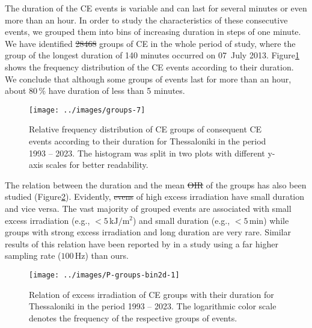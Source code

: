 \documentclass[preprint, 5p,
authoryear]{elsarticle} %
\providecommand{\DIFaddtex}[1]{{\protect\color{blue}\uwave{#1}}} %
\providecommand{\DIFdeltex}[1]{{\protect\color{red}\sout{#1}}}                      %
\providecommand{\DIFaddbegin}{} %
\providecommand{\DIFaddend}{} %
\providecommand{\DIFdelbegin}{} %
\providecommand{\DIFdelend}{} %
\providecommand{\DIFadd}[1]{\texorpdfstring{\DIFaddtex{#1}}{#1}} %
\providecommand{\DIFdel}[1]{\texorpdfstring{\DIFdeltex{#1}}{}} %
\newcommand{\DIFscaledelfig}{0.5}
\newlength{\DIFdelgraphicswidth} %
\newlength{\DIFdelgraphicsheight} %
\newcommand{\DIFaddincludegraphics}[2][]{{\color{blue}\fbox{\DIFOincludegraphics[#1]{#2}}}} %
\newcommand{\DIFdelincludegraphics}[2][]{%
\sbox{\DIFdelgraphicsbox}{\DIFOincludegraphics[#1]{#2}}%
\settoboxwidth{\DIFdelgraphicswidth}{\DIFdelgraphicsbox} %
\settoboxtotalheight{\DIFdelgraphicsheight}{\DIFdelgraphicsbox} %
\scalebox{\DIFscaledelfig}{%
\parbox[b]{\DIFdelgraphicswidth}{\usebox{\DIFdelgraphicsbox}\\[-\baselineskip] \rule{\DIFdelgraphicswidth}{0em}}\llap{\resizebox{\DIFdelgraphicswidth}{\DIFdelgraphicsheight}{%
\setlength{\unitlength}{\DIFdelgraphicswidth}%
\begin{picture}(1,1)%
\thicklines\linethickness{2pt} %
{\color[rgb]{1,0,0}\put(0,0){\framebox(1,1){}}}%
{\color[rgb]{1,0,0}\put(0,0){\line( 1,1){1}}}%
{\color[rgb]{1,0,0}\put(0,1){\line(1,-1){1}}}%
\end{picture}%
}\hspace*{3pt}}} %
} %
\DeclareRobustCommand{\DIFaddbegin}{\DIFOaddbegin \let\includegraphics\DIFaddincludegraphics} %
\DeclareRobustCommand{\DIFaddend}{\DIFOaddend \let\includegraphics\DIFOincludegraphics} %
\DeclareRobustCommand{\DIFdelbegin}{\DIFOdelbegin \let\includegraphics\DIFdelincludegraphics} %
\DeclareRobustCommand{\DIFdelend}{\DIFOaddend \let\includegraphics\DIFOincludegraphics} %
\begin{document}
The duration of the CE events is variable and can last for several
minutes or even more than an hour. In order to study the characteristics
of these consecutive events, we grouped them into bins of increasing
duration in steps of one minute. We have identified \DIFdelbegin \DIFdel{28468 }\DIFdelend \DIFaddbegin \DIFadd{28062 }\DIFaddend groups of CE
in the whole period of study, where the group of the longest duration of
140 minutes occurred on 07~July 2013.
Figure\nobreakspace{}\ref{fig:ceg-duration-distribution} shows the
frequency distribution of the CE events according to their duration. We
conclude that although some groups of events last for more than an hour,
about \(80\,\%\) have duration of less than 5 minutes.

\begin{figure}

{\centering \texttt{[image: ../images/groups-7]} 

}

\caption{Relative frequency distribution of CE groups of consequent CE events according to their duration for Thessaloniki in the period 1993 -- 2023. The histogram was split in two plots with different y-axis scales for better readability.}\label{fig:ceg-duration-distribution}
\end{figure}

The relation between the duration and the mean \DIFdelbegin \DIFdel{OIR }\DIFdelend \DIFaddbegin \DIFadd{OI }\DIFaddend of the groups has also
been studied (Figure\nobreakspace{}\ref{fig:group-2d}). Evidently,
\DIFdelbegin \DIFdel{evens }\DIFdelend \DIFaddbegin \DIFadd{events }\DIFaddend of high excess irradiation have small duration and vice versa.
The vast majority of grouped events are associated with small excess
irradiation (e.g., \(<5\,\text{kJ}/\text{m}^2\)) and small duration
(e.g., \(<5\,\text{min}\)) while groups with strong excess irradiation
and long duration are very rare. Similar results of this relation have
been reported by \citet{Zhang2018} in a study using a far higher
sampling rate (\(100\,\text{Hz}\)) than ours.

\begin{figure}

{\centering \texttt{[image: ../images/P-groups-bin2d-1]} 

}

\caption{Relation of excess irradiation of CE groups with their duration for Thessaloniki in the period 1993 -- 2023. The logarithmic color scale denotes the frequency of the respective groups of events.}\label{fig:group-2d}
\end{figure}
\end{document}
